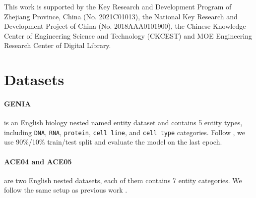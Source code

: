 \documentclass[11pt]{article}
\begin{document}
This work is supported by the Key Research and Development Program of Zhejiang Province, China (No. 2021C01013), the National Key Research and Development Project of China (No. 2018AAA0101900), the Chinese Knowledge Center of Engineering Science and Technology (CKCEST) and MOE Engineering Research Center of Digital Library.
















































\clearpage
\newpage

\appendix

\section{Datasets}



\label{app:statistic}

\paragraph{GENIA} \citep{10.5555/1289189.1289260} is an English biology nested named entity dataset and contains 5 entity types, including \texttt{DNA}, \texttt{RNA}, \texttt{protein}, \texttt{cell line}, and \texttt{cell type} categories. Follow \citet{yu-etal-2020-named}, we use 90\%/10\% train/test split and evaluate the model on the last epoch.

\paragraph{ACE04 and ACE05} \citep{doddington-etal-2004-automatic, 2005-automatic} are two English nested datasets, each of them contains 7 entity categories. We follow the same setup as previous work \citet{katiyar-cardie-2018-nested, lin-etal-2019-sequence}.
\end{document}
